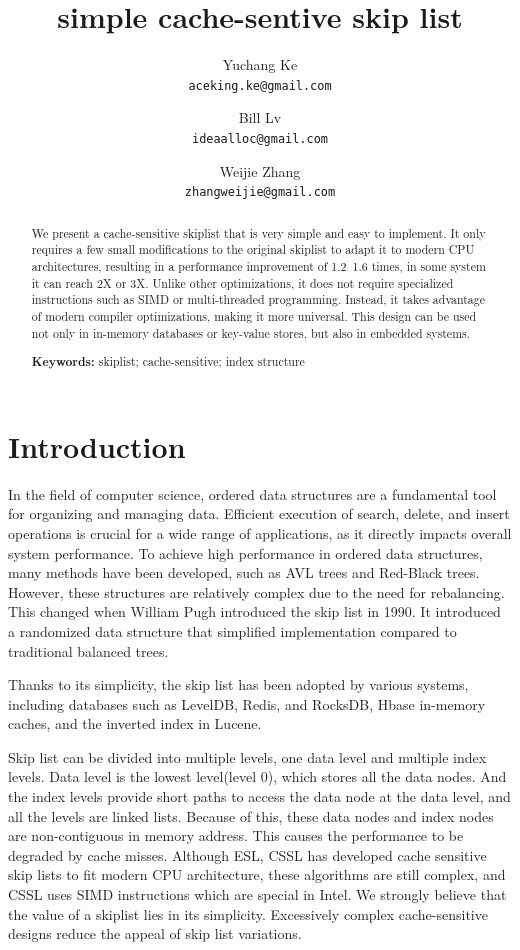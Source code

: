 \documentclass{article}
\title{simple cache-sentive skip list}
\author{Yuchang Ke \\
 \texttt{aceking.ke@gmail.com}
\and Bill Lv \\
\texttt{ideaalloc@gmail.com}
\and Weijie Zhang\\
\texttt{zhangweijie@gmail.com}}
\newcommand{\keywords}[1]{\par\noindent\textbf{Keywords:} #1}
\begin{document}
\maketitle

\begin{abstract}
      We present a cache-sensitive skiplist that is very simple and easy to implement. It only requires a few small modifications to the original skiplist to adapt it to modern CPU architectures, resulting in a performance improvement of 1.2~1.6 times, in some system it can reach 2X or 3X.
      Unlike other optimizations, it does not require specialized instructions such as SIMD or multi-threaded programming. Instead, it takes advantage of modern compiler optimizations, making it more universal. This design can be used not only in in-memory databases or key-value stores, but also in embedded systems.

\keywords{skiplist; cache-sensitive; index structure}
\end{abstract}



\section{Introduction}

In the field of computer science, ordered data structures are a fundamental tool for organizing and managing data. Efficient execution of search, delete, and insert operations is crucial for a wide range of applications, as it directly impacts overall system performance.
To achieve high performance in ordered data structures, many methods have been developed, such as AVL trees and Red-Black trees. However, these structures are relatively complex due to the need for rebalancing. This changed when William Pugh introduced the skip list in 1990\cite{ref1}. It introduced a randomized data structure that simplified implementation compared to traditional balanced trees.

Thanks to its simplicity, the skip list has been adopted by various systems, including databases such as LevelDB\cite{ref2}, Redis\cite{ref7}, and RocksDB\cite{ref3}, Hbase\cite{ref4} in-memory caches, and the inverted index in Lucene.

Skip list can be divided into multiple levels, one data level and multiple index levels. Data level is the lowest level(level 0), which stores all the data nodes. And the index levels provide short paths to access the data node at the data level, and all the levels are linked lists. Because of this, these data nodes and index nodes are non-contiguous in memory address. This causes the performance to be degraded by cache misses.
Although ESL, CSSL has developed cache sensitive skip lists to fit modern CPU architecture, these algorithms are still complex, and CSSL uses SIMD instructions which are special in Intel. We strongly believe that the value of a skiplist lies in its simplicity.  Excessively complex cache-sensitive designs reduce the appeal of skip list variations.
\end{document}
